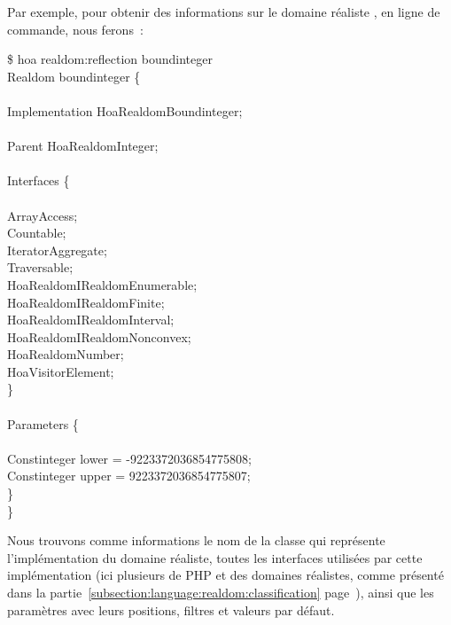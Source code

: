 \begin{example}

Par exemple, pour obtenir des informations sur le domaine réaliste
, en ligne de commande, nous ferons~:
%
\begin{bigpre}
\$ hoa realdom:reflection boundinteger \\
Realdom boundinteger \{ \\
 \\
    Implementation Hoa\bslash{}Realdom\bslash{}Boundinteger; \\
 \\
    Parent Hoa\bslash{}Realdom\bslash{}Integer; \\
 \\
    Interfaces \{ \\
 \\
        ArrayAccess; \\
        Countable; \\
        IteratorAggregate; \\
        Traversable; \\
        Hoa\bslash{}Realdom\bslash{}IRealdom\bslash{}Enumerable; \\
        Hoa\bslash{}Realdom\bslash{}IRealdom\bslash{}Finite; \\
        Hoa\bslash{}Realdom\bslash{}IRealdom\bslash{}Interval; \\
        Hoa\bslash{}Realdom\bslash{}IRealdom\bslash{}Nonconvex; \\
        Hoa\bslash{}Realdom\bslash{}Number; \\
        Hoa\bslash{}Visitor\bslash{}Element; \\
    \} \\
 \\
    Parameters \{ \\
 \\
        [#0 optional] Constinteger lower = -9223372036854775808; \\
        [#1 optional] Constinteger upper = 9223372036854775807; \\
    \} \\
\}
\end{bigpre}
%
Nous trouvons comme informations le nom de la classe qui représente
l'implémentation du domaine réaliste, toutes les interfaces utilisées par cette
implémentation (ici plusieurs de PHP et des domaines réalistes, comme présenté
dans la partie~\ref{subsection:language:realdom:classification}
page~\pageref{subsection:language:realdom:classification}), ainsi que les
paramètres avec leurs positions, filtres et valeurs par défaut.

\end{example}

